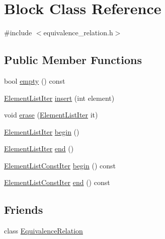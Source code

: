 \hypertarget{classBlock}{\section{Block Class Reference}
\label{classBlock}
}


{\ttfamily \#include $<$equivalence\-\_\-relation.\-h$>$}

\subsection*{Public Member Functions}
\begin{DoxyCompactItemize}
\item 
bool \hyperlink{classBlock_aa7bd121892cfaf6b809770743b722881}{empty} () const 
\item 
\hyperlink{equivalence__relation_8h_a22c88987f7fe558cb3981e02adfe10f9}{Element\-List\-Iter} \hyperlink{classBlock_a8dd3b62565b39719d5065bcb3a602a6f}{insert} (int element)
\item 
void \hyperlink{classBlock_a5bb954a6dd64cf7ab961eb3b73c7c526}{erase} (\hyperlink{equivalence__relation_8h_a22c88987f7fe558cb3981e02adfe10f9}{Element\-List\-Iter} it)
\item 
\hyperlink{equivalence__relation_8h_a22c88987f7fe558cb3981e02adfe10f9}{Element\-List\-Iter} \hyperlink{classBlock_acf6b48387e121c13be045cbdfa7b8728}{begin} ()
\item 
\hyperlink{equivalence__relation_8h_a22c88987f7fe558cb3981e02adfe10f9}{Element\-List\-Iter} \hyperlink{classBlock_a69a6fd777d86ac7538cd67972659428c}{end} ()
\item 
\hyperlink{equivalence__relation_8h_adcd1a68c6846e41421e3868fd40bdd81}{Element\-List\-Const\-Iter} \hyperlink{classBlock_ae4f1ad69095490a589c891c565f85ac4}{begin} () const 
\item 
\hyperlink{equivalence__relation_8h_adcd1a68c6846e41421e3868fd40bdd81}{Element\-List\-Const\-Iter} \hyperlink{classBlock_a836ea3d46f2fdc517124bdd742721fa5}{end} () const 
\end{DoxyCompactItemize}
\subsection*{Friends}
\begin{DoxyCompactItemize}
\item 
class \hyperlink{classBlock_a3075bd6f6bf3f78b0f8befb721ac3f61}{Equivalence\-Relation}
\end{DoxyCompactItemize}


